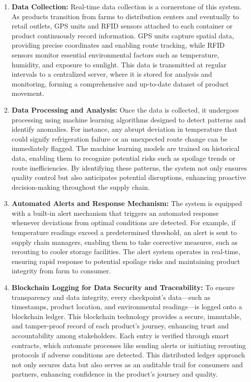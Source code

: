 \documentclass[conference]{IEEEtran}
\begin{document}
\begin{enumerate}

    \item \textbf{Data Collection:} Real-time data collection is a cornerstone of this system. As products transition from farms to distribution centers and eventually to retail outlets, GPS units and RFID sensors attached to each container or product continuously record information. GPS units capture spatial data, providing precise coordinates and enabling route tracking, while RFID sensors monitor essential environmental factors such as temperature, humidity, and exposure to sunlight. This data is transmitted at regular intervals to a centralized server, where it is stored for analysis and monitoring, forming a comprehensive and up-to-date dataset of product movement.\par

    \item \textbf{Data Processing and Analysis:} Once the data is collected, it undergoes processing using machine learning algorithms designed to detect patterns and identify anomalies. For instance, any abrupt deviation in temperature that could signify refrigeration failure or an unexpected route change can be immediately flagged. The machine learning models are trained on historical data, enabling them to recognize potential risks such as spoilage trends or route inefficiencies. By identifying these patterns, the system not only ensures quality control but also anticipates potential disruptions, enhancing proactive decision-making throughout the supply chain.\par

    \item \textbf{Automated Alerts and Response Mechanism:} The system is equipped with a built-in alert mechanism that triggers an automated response whenever deviations from optimal conditions are detected. For example, if temperature readings exceed a predetermined threshold, an alert is sent to supply chain managers, enabling them to take corrective measures, such as rerouting to cooler storage facilities. The alert system operates in real-time, ensuring rapid response to potential spoilage risks and maintaining product integrity from farm to consumer.\par

    \item \textbf{Blockchain Logging for Data Security and Traceability:} To ensure transparency and data integrity, every checkpoint's data—such as timestamps, product location, and environmental readings—is logged onto a blockchain ledger. This blockchain technology provides a secure, immutable, and tamper-proof record of each product's journey, enhancing trust and accountability among stakeholders. Each entry is verified through smart contracts, which automate processes like sending alerts or initiating rerouting protocols if adverse conditions are detected. This distributed ledger approach not only secures data but also serves as an auditable trail for consumers and partners, enhancing confidence in the product's journey and quality.\par

\end{enumerate}
\end{document}
